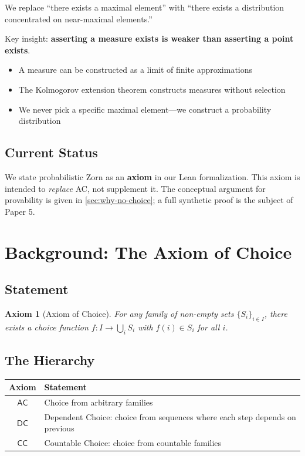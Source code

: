 \documentclass[11pt,a4paper]{article}
\newtheorem{axiom}{Axiom}
\newcommand{\AC}{\mathsf{AC}}
\newcommand{\DC}{\mathsf{DC}}
\newcommand{\CC}{\mathsf{CC}}
\begin{document}
We replace ``there exists a maximal element'' with ``there exists a distribution concentrated on near-maximal elements.''

Key insight: \textbf{asserting a measure exists is weaker than asserting a point exists}.

\begin{itemize}
    \item A measure can be constructed as a limit of finite approximations
    \item The Kolmogorov extension theorem constructs measures without selection
    \item We never pick a specific maximal element---we construct a probability distribution
\end{itemize}

\subsection{Current Status}

We state probabilistic Zorn as an \textbf{axiom} in our Lean formalization. This axiom is intended to \emph{replace} AC, not supplement it. The conceptual argument for provability is given in \cref{sec:why-no-choice}; a full synthetic proof is the subject of Paper 5.

\section{Background: The Axiom of Choice}

\subsection{Statement}

\begin{axiom}[Axiom of Choice]
For any family of non-empty sets $\{S_i\}_{i \in I}$, there exists a choice function $f : I \to \bigcup_i S_i$ with $f(i) \in S_i$ for all $i$.
\end{axiom}

\subsection{The Hierarchy}

\begin{center}
\begin{tabular}{cl}
\toprule
Axiom & Statement \\
\midrule
$\AC$ & Choice from arbitrary families \\
$\DC$ & Dependent Choice: choice from sequences where each step depends on previous \\
$\CC$ & Countable Choice: choice from countable families \\
\bottomrule
\end{tabular}
\end{center}
\end{document}
